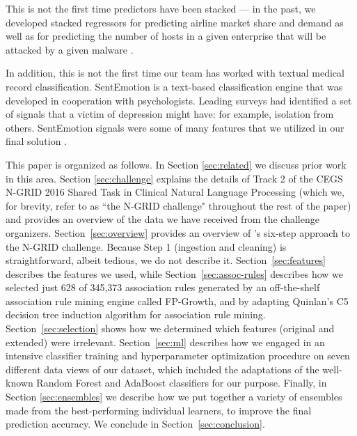 This is not the first time predictors have been stacked --- in the past, we developed stacked regressors for predicting airline market share and demand \cite{an2016map} as well as for predicting the number of hosts in a given enterprise that will be attacked by a given malware
\cite{kang2016ensemble}.

In addition, this is not the first time our team has worked with textual medical record classification. SentEmotion is a text-based classification engine that was developed in cooperation with psychologists. Leading surveys had identified a set of signals that a victim of depression might have: for example, isolation from others. SentEmotion signals were some of many features that we utilized in our final solution \cite{coptads}.

This paper is organized as follows. In Section \ref{sec:related} we discuss prior work in this area.  Section
\ref{sec:challenge} explains the details of Track 2 of the CEGS N-GRID 2016 Shared Task in Clinical Natural Language Processing (which we, for brevity, refer to as ``the N-GRID challenge"
throughout the rest of the paper) and provides an
overview of the data we have received from the challenge organizers.  
Section~\ref{sec:overview} provides an overview of \CREATE's six-step
approach to the N-GRID challenge.  Because Step 1 (ingestion and cleaning) is 
straightforward, albeit tedious, we do not describe it.
Section~\ref{sec:features} describes the features we used, while
Section~\ref{sec:assoc-rules} describes how we selected just 628 of 345,373 association rules  generated by an off-the-shelf association rule mining engine
called FP-Growth\cite{fpgrowth}, and by adapting Quinlan's C5 decision tree
induction algorithm \cite{c45,c5} for association rule mining. 
Section~\ref{sec:selection} shows how we determined 
which features (original and extended) were irrelevant.
Section~\ref{sec:ml} describes how  we engaged in an intensive classifier training and
hyperparameter optimization procedure on seven different data views of our dataset, 
which included the  adaptations of the well-known Random Forest and AdaBoost classifiers
for our purpose.  Finally, in Section \ref{sec:ensembles} we describe how we put together 
a variety of ensembles made from the best-performing individual learners, to 
improve the final prediction accuracy.
We conclude in Section~\ref{sec:conclusion}.
